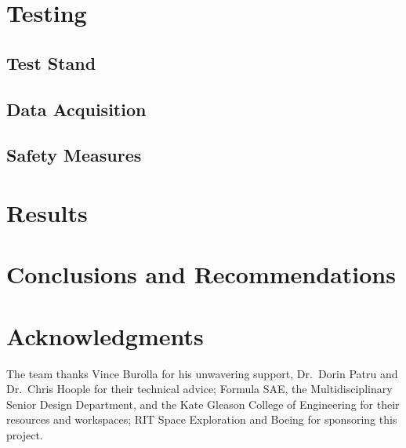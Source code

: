 \documentclass[journal]{IEEEtran}
\begin{document}
\section{Testing}

\subsection{Test Stand}

\subsection{Data Acquisition}

\subsection{Safety Measures}

\section{Results}

\section{Conclusions and Recommendations}

\section*{Acknowledgments}
The team thanks Vince Burolla for his unwavering support, Dr.\ Dorin Patru and Dr.\ Chris Hoople for their technical advice; Formula SAE, the Multidisciplinary Senior Design Department, and the Kate Gleason College of Engineering for their resources and workspaces; RIT Space Exploration and Boeing for sponsoring this project.



\end{document}
